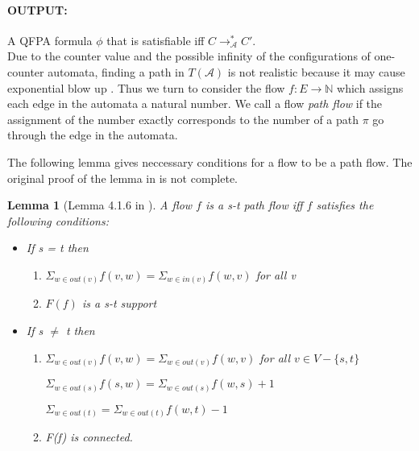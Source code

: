 \documentclass[12pt]{article}
\newtheorem{lemma}{Lemma}
\begin{document}
\paragraph{OUTPUT:} A QFPA formula $\phi$ that is satisfiable iff $C \rightarrow^*_\mathcal{A} C'$.\\

Due to the counter value and the possible infinity of the configurations of one-counter automata, finding a path in $T(\mathcal{A})$ is not realistic because it may cause exponential blow up \cite{DBLP:conf/icalp/ChistikovH17}. Thus we turn to consider the flow $f: E \rightarrow \mathbb{N}$ which assigns each edge in the automata a natural number. We call a flow \textit{path flow } if the assignment of the number exactly corresponds to the number of a path $\pi$ go through the edge in the automata. 

The following lemma gives neccessary conditions for a flow to be a path flow. The original proof of the lemma in \cite{DBLP:conf/icalp/ChistikovH17} is not complete.



\begin{lemma}[Lemma 4.1.6 in \cite{DBLP:conf/icalp/ChistikovH17}]  A flow $f$ is a \textit{s-t} path flow iff $f$ satisfies the following conditions:
\begin{itemize}
\item If s = t then
\begin{enumerate}
\item $\Sigma_{w\in out(v)} f(v,w) = \Sigma_{w\in in(v)} f(w,v)$ for all v
\item $F(f)$ is a s-t support


\end{enumerate}


\item If s $\ne$ t then
\begin{enumerate}
\item $\Sigma_{w\in out(v)} f(v,w) = \Sigma_{w\in out(v)} f(w,v)$ for all $v\in V-\{s,t\}$

$\Sigma_{w\in out(s)} f(s,w) = \Sigma_{w\in out(s)} f(w,s) + 1$

$\Sigma_{w\in out(t)} = \Sigma_{w\in out(t)} f(w,t) - 1$


\item F(f) is connected.
\end{enumerate}

\end{itemize}



\end{lemma}
\end{document}
